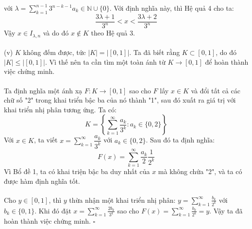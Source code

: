 \documentclass[10.5pt, a4paper]{article}
\begin{document}
với $\lambda=\displaystyle\sum_{k=1}^{n-1}3^{n-k-1}a_k\in\mathbb N\cup\{0\}$. Với định nghĩa này, thì Hệ quả 4 cho ta: $$\dfrac{3\lambda+1}{3^n}<x<\dfrac{3\lambda+2}{3^n}$$
Vậy $x\in I_{\lambda,n}$ và do đó $x\notin K$ theo Hệ quả 3.\\\\
(v) $K$ không đếm được, tức $|K|=|[0,1]|$. Ta đã biết rằng $K\subset[0,1]$, do đó $|K|\le|[0,1]|$. Vì thế nên ta cần tìm một toàn ánh từ $K\rightarrow[0,1]$ để hoàn thành việc chứng minh.\\\\
Ta định nghĩa một ánh xạ $F:K\rightarrow[0,1]$ sao cho $F$ lấy $x\in K$ và đổi tất cả các chữ số "2" trong khai triển bậc ba của nó thành "1", sau đó xuất ra giá trị với khai triển nhị phân tương ứng. Ta có: $$K=\left\{\displaystyle\sum_{k=1}^\infty\dfrac{a_k}{3^k}:a_k\in\{0,2\}\right\}$$
Với $x\in K$, ta viết $x=\displaystyle\sum_{k=1}^\infty\dfrac{a_k}{3^k}$ với $a_k\in\{0,2\}$. Sau đó ta định nghĩa: $$F(x)=\displaystyle\sum_{k=1}^\infty\dfrac{a_k}{2}\dfrac{1}{2^k}$$
Vì Bổ đề 1, ta có khai triện bậc ba duy nhất của $x$ mà không chứa "2", và ta có được hàm định nghĩa tốt.\\\\
Cho $y\in[0,1]$, thì $y$ thừa nhận một khai triển nhị phân: $y=\sum_{k=1}^\infty\frac{b_k}{2^k}$ với $b_k\in\{0,1\}$. Khi đó đặt $x=\sum_{k=1}^\infty\frac{2b_k}{3^k}$ sao cho $F(x)=\sum_{k=1}^\infty\frac{b_k}{2^k}=y$. Vậy ta đã hoàn thành việc chứng minh. $\square$
\end{document}
